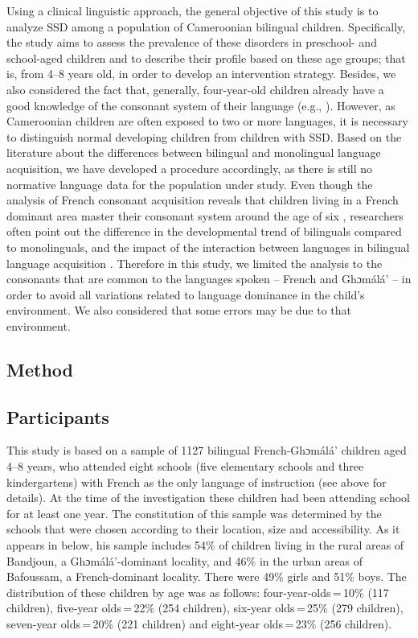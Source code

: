 \documentclass[output=paper,newtxmath,modfonts,nonflat,draftmode]{langsci/langscibook}
\begin{document}
Using a clinical linguistic approach, the general objective of this study is to analyze SSD among a population of Cameroonian bilingual children. Specifically, the study aims to assess the prevalence of these disorders in preschool- and school-aged children and to describe their profile based on these age groups; that is, from 4--8 years old, in order to develop an intervention strategy. Besides, we also considered the fact that, generally, four-year-old children already have a good knowledge of the consonant system of their language (e.g., \citealt{MacLeodEtAl2011}). However, as Cameroonian children are often exposed to two or more languages, it is necessary to distinguish normal developing children from children with SSD. Based on the literature about the differences between bilingual and monolingual language acquisition, we have developed a procedure accordingly, as there is still no normative language data for the population under study. Even though the analysis of French consonant acquisition reveals that children living in a French dominant area master their consonant system around the age of six \cite{Rvachew2013}, researchers often point out the difference in the developmental trend of bilinguals compared to monolinguals, and the impact of the interaction between languages in bilingual language acquisition \cite{Paradis2011}. Therefore in this study, we limited the analysis to the consonants that are common to the languages spoken – French and Ghɔmálá’ – in order to avoid all variations related to language dominance in the child’s environment. We also considered that some errors may be due to that environment. 

\subsection{Method} %

\subsection{Participants}

This study is based on a sample of 1127 bilingual French-Ghɔmálá’ children aged 4--8 years, who attended eight schools (five elementary schools and three kindergartens) with French as the only language of instruction (see  above for details). At the time of the investigation these children had been attending school for at least one year. The constitution of this sample was determined by the schools that were chosen according to their location, size and accessibility. As it appears in  below, his sample includes 54\% of children living in the rural areas of Bandjoun, a Ghɔmálá’-dominant locality, and 46\% in the urban areas of Bafoussam, a French-dominant locality. There were 49\% girls and 51\% boys. The distribution of these children by age was as follows: four-year-olds\,=\,10\% (117 children), five-year olds\,=\,22\% (254 children), six-year olds\,=\,25\% (279 children), seven-year olds\,=\,20\% (221 children) and eight-year olds\,=\,23\% (256 children).
\end{document}
